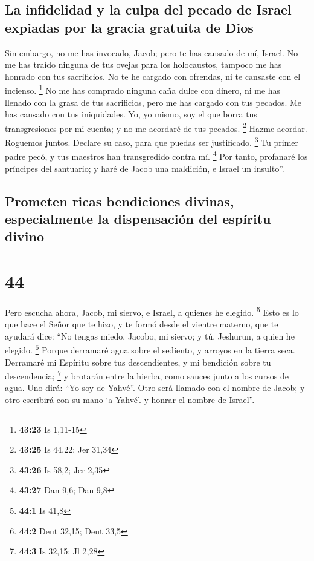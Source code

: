 \hypertarget{la-infidelidad-y-la-culpa-del-pecado-de-israel-expiadas-por-la-gracia-gratuita-de-dios}{%
\subsection{La infidelidad y la culpa del pecado de Israel expiadas por
la gracia gratuita de
Dios}\label{la-infidelidad-y-la-culpa-del-pecado-de-israel-expiadas-por-la-gracia-gratuita-de-dios}}

 Sin embargo, no me has invocado, Jacob; pero te has
cansado de mí, Israel.  No me has traído ninguna de tus
ovejas para los holocaustos, tampoco me has honrado con tus sacrificios.
No te he cargado con ofrendas, ni te cansaste con el incienso.
\footnote{\textbf{43:23} Is 1,11-15}  No me has comprado
ninguna caña dulce con dinero, ni me has llenado con la grasa de tus
sacrificios, pero me has cargado con tus pecados. Me has cansado con tus
iniquidades.  Yo, yo mismo, soy el que borra tus
transgresiones por mi cuenta; y no me acordaré de tus pecados.
\footnote{\textbf{43:25} Is 44,22; Jer 31,34}  Hazme
acordar. Roguemos juntos. Declare su caso, para que puedas ser
justificado. \footnote{\textbf{43:26} Is 58,2; Jer 2,35} 
Tu primer padre pecó, y tus maestros han transgredido contra mí.
\footnote{\textbf{43:27} Dan 9,6; Dan 9,8}  Por tanto,
profanaré los príncipes del santuario; y haré de Jacob una maldición, e
Israel un insulto''.

\hypertarget{prometen-ricas-bendiciones-divinas-especialmente-la-dispensaciuxf3n-del-espuxedritu-divino}{%
\subsection{Prometen ricas bendiciones divinas, especialmente la
dispensación del espíritu
divino}\label{prometen-ricas-bendiciones-divinas-especialmente-la-dispensaciuxf3n-del-espuxedritu-divino}}

\hypertarget{section-43}{%
\section{44}\label{section-43}}

 Pero escucha ahora, Jacob, mi siervo, e Israel, a quienes
he elegido. \footnote{\textbf{44:1} Is 41,8}  Esto es lo
que hace el Señor que te hizo, y te formó desde el vientre materno, que
te ayudará dice: ``No tengas miedo, Jacobo, mi siervo; y tú, Jeshurun, a
quien he elegido. \footnote{\textbf{44:2} Deut 32,15; Deut 33,5}
 Porque derramaré agua sobre el sediento, y arroyos en la
tierra seca. Derramaré mi Espíritu sobre tus descendientes, y mi
bendición sobre tu descendencia; \footnote{\textbf{44:3} Is 32,15; Jl
  2,28}  y brotarán entre la hierba, como sauces junto a
los cursos de agua.  Uno dirá: ``Yo soy de Yahvé''. Otro
será llamado con el nombre de Jacob; y otro escribirá con su mano `a
Yahvé'. y honrar el nombre de Israel''.

